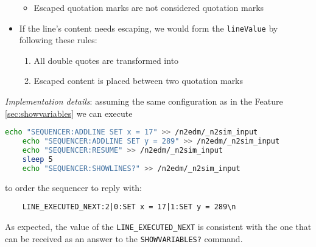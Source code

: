 \begin{itemize}
{\begin{itemize}
			\item Escaped quotation marks  are not considered quotation marks
		\end{itemize}
	}
	\item{
		If the line's content needs escaping, we would form the \texttt{lineValue} by following these rules:
		\begin{enumerate}
			\item All double quotes  are transformed into 
			\item Escaped content is placed between two quotation marks 
		\end{enumerate}
	}
\end{itemize}

\textit{Implementation details}: assuming the same configuration as in the Feature \ref{sec:showvariables} we can execute

\begin{lstlisting}[language=bash]
	echo "SEQUENCER:ADDLINE SET x = 17" >> /n2edm/_n2sim_input
	echo "SEQUENCER:ADDLINE SET y = 289" >> /n2edm/_n2sim_input
	echo "SEQUENCER:RESUME" >> /n2edm/_n2sim_input
	sleep 5
	echo "SEQUENCER:SHOWLINES?" >> /n2edm/_n2sim_input
\end{lstlisting}

to order the sequencer to reply with:

\begin{verbatim}
	LINE_EXECUTED_NEXT:2|0:SET x = 17|1:SET y = 289\n
\end{verbatim}

As expected, the value of the \texttt{LINE\_EXECUTED\_NEXT} is consistent with the one that can be received as an answer to the \texttt{SHOWVARIABLES?} command.